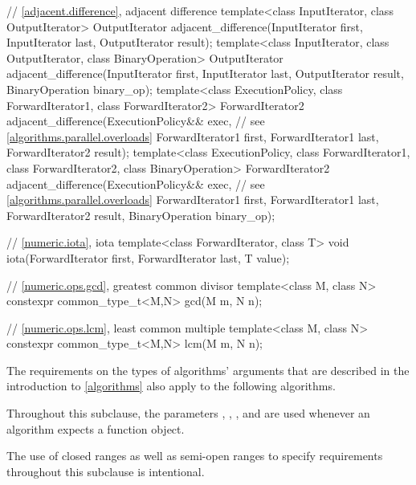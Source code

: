 \begin{codeblock}
{  // \ref{adjacent.difference}, adjacent difference
  template<class InputIterator, class OutputIterator>
    OutputIterator adjacent_difference(InputIterator first,
                                       InputIterator last,
                                       OutputIterator result);
  template<class InputIterator, class OutputIterator, class BinaryOperation>
    OutputIterator adjacent_difference(InputIterator first,
                                       InputIterator last,
                                       OutputIterator result,
                                       BinaryOperation binary_op);
  template<class ExecutionPolicy, class ForwardIterator1, class ForwardIterator2>
    ForwardIterator2 adjacent_difference(ExecutionPolicy&& exec, // see \ref{algorithms.parallel.overloads}
                                         ForwardIterator1 first,
                                         ForwardIterator1 last,
                                         ForwardIterator2 result);
  template<class ExecutionPolicy, class ForwardIterator1, class ForwardIterator2,
           class BinaryOperation>
    ForwardIterator2 adjacent_difference(ExecutionPolicy&& exec, // see \ref{algorithms.parallel.overloads}
                                         ForwardIterator1 first,
                                         ForwardIterator1 last,
                                         ForwardIterator2 result,
                                         BinaryOperation binary_op);

  // \ref{numeric.iota}, iota
  template<class ForwardIterator, class T>
    void iota(ForwardIterator first, ForwardIterator last, T value);

  // \ref{numeric.ops.gcd}, greatest common divisor
  template<class M, class N>
    constexpr common_type_t<M,N> gcd(M m, N n);

  // \ref{numeric.ops.lcm}, least common multiple
  template<class M, class N>
    constexpr common_type_t<M,N> lcm(M m, N n);
}
\end{codeblock}

\pnum
The requirements on the types of algorithms' arguments that are
described in the introduction to \ref{algorithms} also
apply to the following algorithms.

\pnum
Throughout this subclause, the parameters
,
,
,
and 
are used
whenever an algorithm expects a function object.

\pnum
\begin{note}
The use of closed ranges as well as semi-open ranges to specify requirements
throughout this subclause is intentional.
\end{note}

